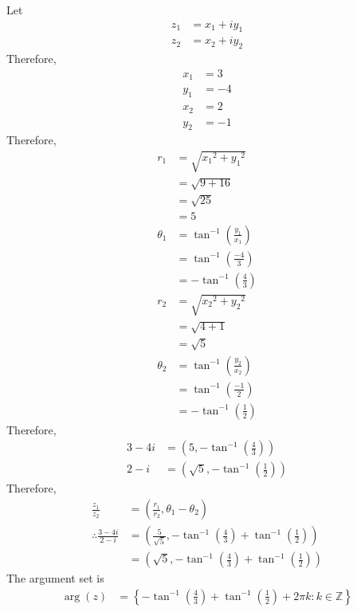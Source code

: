 \documentclass[fleqn, a4paper, 11pt, oneside]{amsart}
\theoremstyle{definition}
\theoremstyle{theorem}
\begin{document}
\begin{solution}
\begin{enumerate}[leftmargin=*]
			Let
			\begin{align*}
				z_1 &= x_1 + i y_1\\
				z_2 &= x_2 + i y_2
			\end{align*}
			Therefore,
			\begin{align*}
				x_1 &= 3\\
				y_1 &= -4\\
				x_2 &= 2\\
				y_2 &= -1
			\end{align*}
			Therefore,
			\begin{align*}
				r_1 &= \sqrt{{x_1}^2 + {y_1}^2}\\
				&= \sqrt{9 + 16}\\
				&= \sqrt{25}\\
				&= 5\\
				\theta_1 &= \tan^{-1}\left( \frac{y_1}{x_1} \right)\\
				&= \tan^{-1}\left( \frac{-4}{3} \right)\\
				&= -\tan^{-1}\left( \frac{4}{3} \right)\\
				r_2 &= \sqrt{{x_2}^2 + {y_2}^2}\\
				&= \sqrt{4 + 1}\\
				&= \sqrt{5}\\
				\theta_2 &= \tan^{-1}\left( \frac{y_2}{x_2} \right)\\
				&= \tan^{-1}\left( \frac{-1}{2} \right)\\
				&= -\tan^{-1}\left( \frac{1}{2} \right)
			\end{align*}
			Therefore,
			\begin{align*}
				3 - 4 i &= \left( 5 , -\tan^{-1}\left( \frac{4}{3} \right) \right)\\
				2 - i &= \left( \sqrt{5} , -\tan^{-1}\left( \frac{1}{2} \right) \right)
			\end{align*}
			Therefore,
			\begin{align*}
				\frac{z_1}{z_2} &= \left( \frac{r_1}{r_2} , \theta_1 - \theta_2 \right)\\
				\therefore \frac{3 - 4 i}{2 - i} &= \left( \frac{5}{\sqrt{5}} , -\tan^{-1}\left( \frac{4}{3} \right) + \tan^{-1}\left( \frac{1}{2} \right) \right)\\
				&= \left( \sqrt{5} , -\tan^{-1}\left( \frac{4}{3} \right) + \tan^{-1}\left( \frac{1}{2} \right) \right)
			\end{align*}
			The argument set is
			\begin{align*}
				\arg(z) &= \left\{ -\tan^{-1}\left( \frac{4}{3} \right) + \tan^{-1}\left( \frac{1}{2} \right) + 2 \pi k : k \in \mathbb{Z} \right\}
			\end{align*}
	\end{enumerate}
\end{solution}
\end{document}
